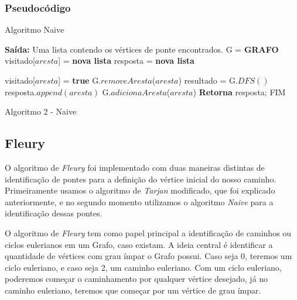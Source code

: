 \subsubsection{Pseudocódigo}


\begin{center}	
	\vspace{-0.3cm}
\begin{minipage}[ht]{13cm}
\begin{algorithm}[H]
  \footnotesize
  \caption{Algoritmo Naive}
  \label{alg:2}
  \begin{algorithmic}[2]
     \STATE \textbf{Saída:} Uma lista contendo os vértices de ponte encontrados.
     \STATE G = \textbf{GRAFO}
     \STATE visitado[$aresta$] = \textbf{nova lista}
     \STATE resposta = \textbf{nova lista}
     
            \STATE visitado[$aresta$] = \textbf{true}
            \STATE G.$removeAresta$($aresta$)
            \STATE resultado = G.$DFS()$
                \STATE resposta.$append(aresta)$
            \ENDIF
            \STATE G.$adicionaAresta$($aresta$)
        \ENDIF
    \ENDFOR
    \STATE \textbf{Retorna} resposta; FIM
  \end{algorithmic}
\end{algorithm}
\caption{Algoritmo 2 - Naive}
\end{minipage}
\end{center}

\subsection{Fleury}
O algoritmo de \textit{Fleury} foi implementado com duas maneiras distintas de identificação de pontes para a definição do vértice inicial do nosso caminho. Primeiramente usamos o algoritmo de \textit{Tarjan} modificado, que foi explicado anteriormente, e no segundo momento utilizamos o algoritmo \textit{Naive} para a identificação dessas pontes.

O algoritmo de \textit{Fleury} tem como papel principal a identificação de caminhos ou ciclos eulerianos em um Grafo, caso existam. A ideia central é identificar a quantidade de vértices com grau ímpar o Grafo possui. Caso seja 0, teremos um ciclo euleriano, e caso seja 2, um caminho euleriano. Com um ciclo euleriano, poderemos começar o caminhamento por qualquer vértice desejado, já no caminho euleriano, teremos que começar por um vértice de grau ímpar.

